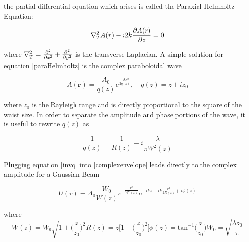\documentclass[oneside]{book}
\begin{document}
		the partial differential equation which arises is called the Paraxial Helmholtz Equation:
		
		\begin{equation}\label{paraHelmholtz}
		\nabla_T^2 A(r) - i2k {\partial A(r) \over \partial z} = 0
		\end{equation}
		
		where $\nabla_T^2 = {\partial^2  \over \partial x^2} + {\partial^2  \over \partial y^2} $ is the transverse Laplacian.  A simple solution for equation \ref{paraHelmholtz} is the complex paraboloidal wave
		
		\begin{equation} \label{complexenvelope}
		A(\mathbf{r}) = \frac{A_0}{q(z)} e^{\frac{-ikr^2}{2q(z)}} , \quad q(z)=z+iz_0
		\end{equation}
		
		where $z_0$ is the Rayleigh range and is directly proportional to the square of the waist size.  In order to separate the amplitude and phase portions of the wave, it is useful to rewrite $q(z)$ as
		
		\begin{equation}\label{invq}
		\frac{1}{q(z)} = \frac{1}{R(z)} - i \frac{\lambda}{\pi W^2(z)}
		\end{equation} 
		
		Plugging equation \ref{invq} into \ref{complexenvelope} leads directly to the complex amplitude for a Gaussian Beam
		
		\begin{equation}
		U(r) = A_0 \frac{W_0}{W(z)} e^{-\frac{r^2}{W^2(z)}} e^{-ikz - ik \frac{r^2}{2R(z)} + i \phi(z)}
		\end{equation}
		
		where
		\begin{subequations}
		\begin{equation}
		W(z) = W_0 \sqrt{1 + \bigg( \frac{z}{z_0} \bigg)^2}
		\end{equation}
		\begin{equation}\label{ROC}
		R(z) = z \bigg[ 1 + \bigg( \frac{z}{z_0} \bigg)^2 \bigg]
		\end{equation}
		\begin{equation}
		\phi(z)= \text{tan}^{-1}\bigg(\frac{z}{z_0}\bigg)
		\end{equation}
		\begin{equation}
		W_0 = \sqrt{\frac{\lambda z_0}{\pi}}
		\end{equation}
		\end{subequations}
\end{document}

